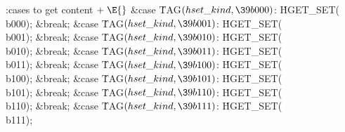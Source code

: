 
\getcode
\Y\B\4:cases to get content\X${}\mathrel+\E{}$\6
\4\&{case} \.{TAG}${}(\index{hset kind+\\{hset\_kind}}\\{hset\_kind},\39\\{b000}){}$:\5
\.{HGET\_SET}(\\{b000});\5
\&{break};\6
\4\&{case} \.{TAG}${}(\index{hset kind+\\{hset\_kind}}\\{hset\_kind},\39\\{b001}){}$:\5
\.{HGET\_SET}(\\{b001});\5
\&{break};\6
\4\&{case} \.{TAG}${}(\index{hset kind+\\{hset\_kind}}\\{hset\_kind},\39\\{b010}){}$:\5
\.{HGET\_SET}(\\{b010});\5
\&{break};\6
\4\&{case} \.{TAG}${}(\index{hset kind+\\{hset\_kind}}\\{hset\_kind},\39\\{b011}){}$:\5
\.{HGET\_SET}(\\{b011});\5
\&{break};\6
\4\&{case} \.{TAG}${}(\index{hset kind+\\{hset\_kind}}\\{hset\_kind},\39\\{b100}){}$:\5
\.{HGET\_SET}(\\{b100});\5
\&{break};\6
\4\&{case} \.{TAG}${}(\index{hset kind+\\{hset\_kind}}\\{hset\_kind},\39\\{b101}){}$:\5
\.{HGET\_SET}(\\{b101});\5
\&{break};\6
\4\&{case} \.{TAG}${}(\index{hset kind+\\{hset\_kind}}\\{hset\_kind},\39\\{b110}){}$:\5
\.{HGET\_SET}(\\{b110});\5
\&{break};\6
\4\&{case} \.{TAG}${}(\index{hset kind+\\{hset\_kind}}\\{hset\_kind},\39\\{b111}){}$:\5
\.{HGET\_SET}(\\{b111});\5
